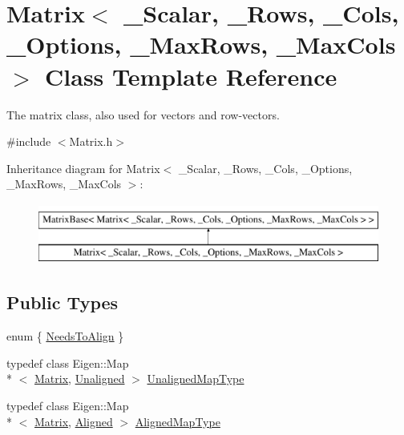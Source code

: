 \hypertarget{class_matrix}{\section{Matrix$<$ \-\_\-\-Scalar, \-\_\-\-Rows, \-\_\-\-Cols, \-\_\-\-Options, \-\_\-\-Max\-Rows, \-\_\-\-Max\-Cols $>$ Class Template Reference}
\label{class_matrix}
}


The matrix class, also used for vectors and row-\/vectors.  




{\ttfamily \#include $<$Matrix.\-h$>$}

Inheritance diagram for Matrix$<$ \-\_\-\-Scalar, \-\_\-\-Rows, \-\_\-\-Cols, \-\_\-\-Options, \-\_\-\-Max\-Rows, \-\_\-\-Max\-Cols $>$\-:\begin{figure}[H]
\begin{center}
\leavevmode
\includegraphics[height=2.000000cm]{class_matrix}
\end{center}
\end{figure}
\subsection*{Public Types}
\begin{DoxyCompactItemize}
\item 
enum \{ \hyperlink{class_matrix_a4449cc5b7cfb0068189194ee2acbdc18a47b4646119f7f6e843fd50555b8366a9}{Needs\-To\-Align}
 \}
\item 
typedef class Eigen\-::\-Map\\*
$<$ \hyperlink{class_matrix}{Matrix}, \hyperlink{_constants_8h_af38129fd1797a5cfd7d746065784a44fafeaf599f3da3693d2ab4a7cc48a19437}{Unaligned} $>$ \hyperlink{class_matrix_a351013142295ee30707ec0025633dcde}{Unaligned\-Map\-Type}
\item 
typedef class Eigen\-::\-Map\\*
$<$ \hyperlink{class_matrix}{Matrix}, \hyperlink{_constants_8h_af38129fd1797a5cfd7d746065784a44fad5380ca00f3d74b38593adf8a0d06d3e}{Aligned} $>$ \hyperlink{class_matrix_a8fbe7258317b503b5426051cc5602e5f}{Aligned\-Map\-Type}
\end{DoxyCompactItemize}

